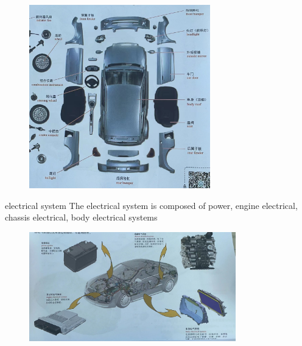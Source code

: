 \begin{frame}
	\begin{block}{}
		\begin{figure}[htbp]
			\centering
			\includegraphics[width=0.7\textwidth]{1-12}
		\end{figure}
	\end{block}
\end{frame}
\begin{frame}
	\begin{block}{electrical system}
		The electrical system is composed of power, engine electrical, chassis electrical, body electrical systems
		\begin{figure}[htbp]
			\centering
			\includegraphics[width=0.8\textwidth]{1-13}
		\end{figure}
	\end{block}
\end{frame}
